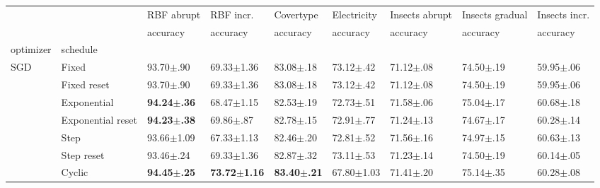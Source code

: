 \begin{tabular}{lllllllll}
    \toprule
                             &                   & RBF abrupt              & RBF incr.                & Covertype               & Electricity             & Insects abrupt          & Insects gradual         & Insects incr.           \\
                             &                   & accuracy                & accuracy                 & accuracy                & accuracy                & accuracy                & accuracy                & accuracy                \\
    optimizer                & schedule          &                         &                          &                         &                         &                         &                         &                         \\
    \midrule
    \multirow[c]{8}{*}{SGD}  & Fixed             & 93.70$\pm$.90           & 69.33$\pm$1.36           & 83.08$\pm$.18           & 73.12$\pm$.42           & 71.12$\pm$.08           & 74.50$\pm$.19           & 59.95$\pm$.06           \\
                             & Fixed reset       & 93.70$\pm$.90           & 69.33$\pm$1.36           & 83.08$\pm$.18           & 73.12$\pm$.42           & 71.12$\pm$.08           & 74.50$\pm$.19           & 59.95$\pm$.06           \\
                             & Exponential       & \bfseries 94.24$\pm$.36 & 68.47$\pm$1.15           & 82.53$\pm$.19           & 72.73$\pm$.51           & 71.58$\pm$.06           & 75.04$\pm$.17           & 60.68$\pm$.18           \\
                             & Exponential reset & \bfseries 94.23$\pm$.38 & 69.86$\pm$.87            & 82.78$\pm$.15           & 72.91$\pm$.77           & 71.24$\pm$.13           & 74.67$\pm$.17           & 60.28$\pm$.14           \\
                             & Step              & 93.66$\pm$1.09          & 67.33$\pm$1.13           & 82.46$\pm$.20           & 72.81$\pm$.52           & 71.56$\pm$.16           & 74.97$\pm$.15           & 60.63$\pm$.13           \\
                             & Step reset        & 93.46$\pm$.24           & 69.33$\pm$1.36           & 82.87$\pm$.32           & 73.11$\pm$.53           & 71.23$\pm$.14           & 74.50$\pm$.19           & 60.14$\pm$.05           \\
                             & Cyclic            & \bfseries 94.45$\pm$.25 & \bfseries 73.72$\pm$1.16 & \bfseries 83.40$\pm$.21 & 67.80$\pm$1.03          & 71.41$\pm$.20           & 75.14$\pm$.35           & 60.28$\pm$.08           \\

\end{tabular}
